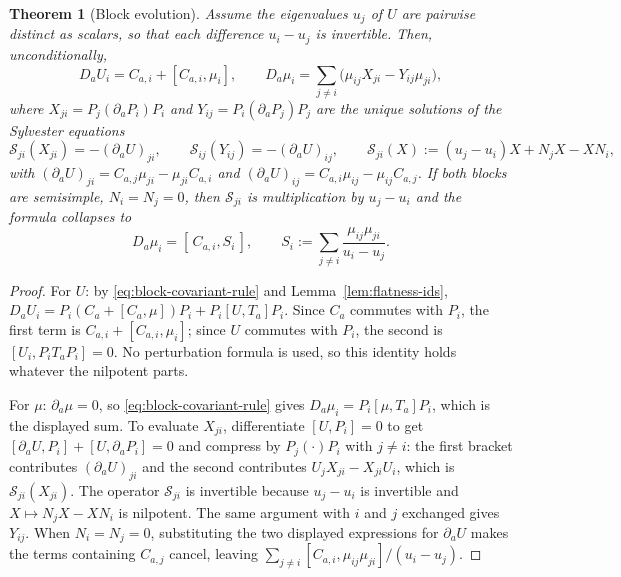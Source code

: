 \documentclass[11pt]{article}
\newtheorem{theorem}{Theorem}
\theoremstyle{definition}
\theoremstyle{remark}
\begin{document}
\begin{theorem}[Block evolution]
\label{thm:block-evolution}
Assume the eigenvalues $u_j$ of $U$ are pairwise distinct as scalars, so that
each difference $u_i-u_j$ is invertible. Then, unconditionally,
\[
  D_aU_i=C_{a,i}+[C_{a,i},\mu_i],
  \qquad
  D_a\mu_i=\sum_{j\ne i}\bigl(\mu_{ij}X_{ji}-Y_{ij}\mu_{ji}\bigr),
\]
where $X_{ji}=P_j(\partial_aP_i)P_i$ and $Y_{ij}=P_i(\partial_aP_j)P_j$ are the
unique solutions of the Sylvester equations
\[
  \mathcal S_{ji}(X_{ji})=-(\partial_aU)_{ji},
  \qquad
  \mathcal S_{ij}(Y_{ij})=-(\partial_aU)_{ij},
  \qquad
  \mathcal S_{ji}(X):=(u_j-u_i)X+N_jX-XN_i ,
\]
with $(\partial_aU)_{ji}=C_{a,j}\mu_{ji}-\mu_{ji}C_{a,i}$ and
$(\partial_aU)_{ij}=C_{a,i}\mu_{ij}-\mu_{ij}C_{a,j}$. If \emph{both} blocks are
semisimple, $N_i=N_j=0$, then $\mathcal S_{ji}$ is multiplication by $u_j-u_i$
and the formula collapses to
\[
  D_a\mu_i=[\,C_{a,i},S_i\,],
  \qquad
  S_i:=\sum_{j\ne i}\frac{\mu_{ij}\mu_{ji}}{u_i-u_j} .
  \tag{6.2}
  \label{eq:semisimple-residue-evolution}
\]
\end{theorem}

\begin{proof}
For $U$: by \eqref{eq:block-covariant-rule} and Lemma~\ref{lem:flatness-ids},
$D_aU_i=P_i(C_a+[C_a,\mu])P_i+P_i[U,T_a]P_i$. Since $C_a$ commutes with $P_i$,
the first term is $C_{a,i}+[C_{a,i},\mu_i]$; since $U$ commutes with $P_i$, the
second is $[U_i,P_iT_aP_i]=0$. No perturbation formula is used, so this identity
holds whatever the nilpotent parts.

For $\mu$: $\partial_a\mu=0$, so \eqref{eq:block-covariant-rule} gives
$D_a\mu_i=P_i[\mu,T_a]P_i$, which is the displayed sum. To evaluate $X_{ji}$,
differentiate $[U,P_i]=0$ to get $[\partial_aU,P_i]+[U,\partial_aP_i]=0$ and
compress by $P_j(\cdot)P_i$ with $j\ne i$: the first bracket contributes
$(\partial_aU)_{ji}$ and the second contributes $U_jX_{ji}-X_{ji}U_i$, which is
$\mathcal S_{ji}(X_{ji})$. The operator $\mathcal S_{ji}$ is invertible because
$u_j-u_i$ is invertible and $X\mapsto N_jX-XN_i$ is nilpotent. The same argument
with $i$ and $j$ exchanged gives $Y_{ij}$. When $N_i=N_j=0$, substituting the
two displayed expressions for $\partial_aU$ makes the terms containing $C_{a,j}$
cancel, leaving $\sum_{j\ne i}[C_{a,i},\mu_{ij}\mu_{ji}]/(u_i-u_j)$.
\end{proof}
\end{document}
